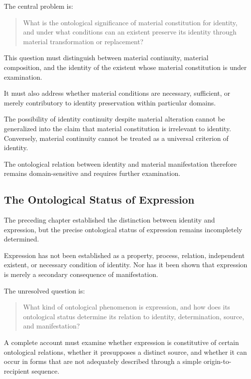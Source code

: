 The central problem is:

\begin{quote}
What is the ontological significance of material
constitution for identity, and under what conditions
can an existent preserve its identity through material
transformation or replacement?
\end{quote}

This question must distinguish between material
continuity, material composition, and the identity of
the existent whose material constitution is under
examination.

It must also address whether material conditions are
necessary, sufficient, or merely contributory to
identity preservation within particular domains.

The possibility of identity continuity despite material
alteration cannot be generalized into the claim that
material constitution is irrelevant to identity.
Conversely, material continuity cannot be treated as
a universal criterion of identity.

The ontological relation between identity and material
manifestation therefore remains domain-sensitive and
requires further examination.


\subsection{The Ontological Status of Expression}

The preceding chapter established the distinction
between identity and expression, but the precise
ontological status of expression remains incompletely
determined.

Expression has not been established as a property,
process, relation, independent existent, or necessary
condition of identity. Nor has it been shown that
expression is merely a secondary consequence of
manifestation.

The unresolved question is:

\begin{quote}
What kind of ontological phenomenon is expression,
and how does its ontological status determine its
relation to identity, determination, source, and
manifestation?
\end{quote}

A complete account must examine whether expression
is constitutive of certain ontological relations, whether
it presupposes a distinct source, and whether it can
occur in forms that are not adequately described
through a simple origin-to-recipient sequence.

